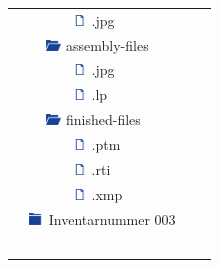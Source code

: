 \begin{center}
\begin{tabular}{l l l l r p{}}
		& & & \includegraphics[width=0.4cm]{bilder/DateiIcon.png} \hspace*{0.04cm} .jpg &  & \\
		& & \multicolumn{2}{l}{\includegraphics[width=0.4cm]{bilder/OrdnerIconAuf.png} \hspace*{0.04cm} assembly-files} &  & \\
		& & & \includegraphics[width=0.4cm]{bilder/DateiIcon.png} \hspace*{0.04cm} .jpg &  & \\
		& & & \includegraphics[width=0.4cm]{bilder/DateiIcon.png} \hspace*{0.04cm} .lp &  & \\
		& & \multicolumn{2}{l}{\includegraphics[width=0.4cm]{bilder/OrdnerIconAuf.png} \hspace*{0.04cm} finished-files} &  & \\
		& & & \includegraphics[width=0.4cm]{bilder/DateiIcon.png} \hspace*{0.04cm} .ptm &  & \\
		& & & \includegraphics[width=0.4cm]{bilder/DateiIcon.png} \hspace*{0.04cm} .rti &  & \\
		& & & \includegraphics[width=0.4cm]{bilder/DateiIcon.png} \hspace*{0.04cm} .xmp &  & \\
		& \multicolumn{3}{l}{\includegraphics[width=0.4cm]{bilder/OrdnerIconZu.png} \hspace*{0.04cm} Inventarnummer 003} &  & \\
		& & & & & \\
		& & & & & \\
		& & & & & \\
		& & & & & \\
		& & & & & \\
 		\bottomrule 
		\bottomrule
	\end{tabular}
\end{center}

